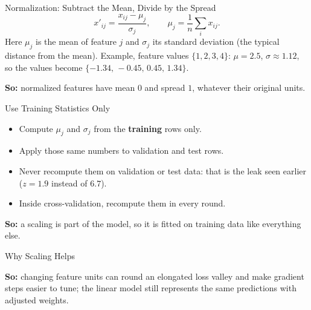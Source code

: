 \documentclass{ntuabeamer}
\newcommand{\takeaway}[1]{\par\vspace{0.3cm}\begingroup\raggedright\noindent
  {\color{courseblue}\textbf{So:}} #1\par\endgroup}
\begin{document}
\begin{frame}{Normalization: Subtract the Mean, Divide by the Spread}
  \[
    x'_{ij}=\frac{x_{ij}-\mu_j}{\sigma_j},
    \qquad
    \mu_j=\frac1{n}\sum_{i}x_{ij}.
  \]
  Here $\mu_j$ is the mean of feature $j$ and $\sigma_j$ its standard deviation (the typical distance from the mean).
  Example, feature values $\{1,2,3,4\}$: $\mu=2.5$, $\sigma\approx1.12$, so the values become
  $\{-1.34,\,-0.45,\,0.45,\,1.34\}$.
  \takeaway{normalized features have mean $0$ and spread $1$, whatever their original units.}
\end{frame}

\begin{frame}{Use Training Statistics Only}
  \begin{itemize}
    \item Compute $\mu_j$ and $\sigma_j$ from the \textbf{training} rows only.
    \item Apply those same numbers to validation and test rows.
    \item Never recompute them on validation or test data: that is the leak seen earlier ($z=1.9$ instead of $6.7$).
    \item Inside cross-validation, recompute them in every round.
  \end{itemize}
  \takeaway{a scaling is part of the model, so it is fitted on training data like everything else.}
\end{frame}

\begin{frame}{Why Scaling Helps}
  \centering
  \raggedright
  \takeaway{changing feature units can round an elongated loss valley and make gradient steps easier to tune; the linear model still represents the same predictions with adjusted weights.}
\end{frame}
\end{document}
